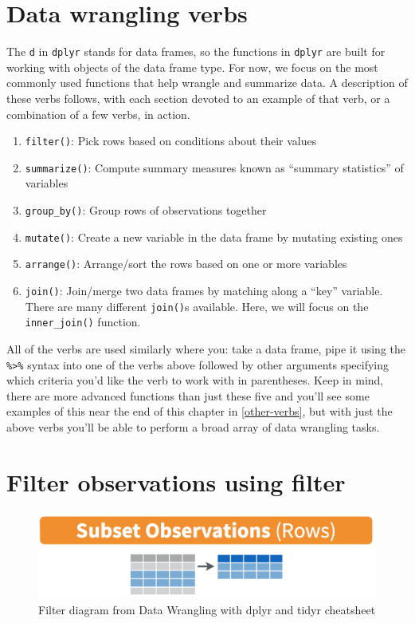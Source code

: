 \documentclass[12pt,]{krantz}
\providecommand{\tightlist}{%
  \setlength{\itemsep}{0pt}\setlength{\parskip}{0pt}}
\begin{document}
\section{Data wrangling verbs}\label{verbs}

The \texttt{d} in \texttt{dplyr} stands for data frames, so the
functions in \texttt{dplyr} are built for working with objects of the
data frame type. For now, we focus on the most commonly used functions
that help wrangle and summarize data. A description of these verbs
follows, with each section devoted to an example of that verb, or a
combination of a few verbs, in action.

\begin{enumerate}
\def\labelenumi{\arabic{enumi}.}
\tightlist
\item
  \texttt{filter()}: Pick rows based on conditions about their values
\item
  \texttt{summarize()}: Compute summary measures known as ``summary
  statistics'' of variables
\item
  \texttt{group\_by()}: Group rows of observations together
\item
  \texttt{mutate()}: Create a new variable in the data frame by mutating
  existing ones
\item
  \texttt{arrange()}: Arrange/sort the rows based on one or more
  variables
\item
  \texttt{join()}: Join/merge two data frames by matching along a
  ``key'' variable. There are many different \texttt{join()}s available.
  Here, we will focus on the \texttt{inner\_join()} function.
\end{enumerate}

All of the verbs are used similarly where you: take a data frame, pipe
it using the \texttt{\%\textgreater{}\%} syntax into one of the verbs
above followed by other arguments specifying which criteria you'd like
the verb to work with in parentheses. Keep in mind, there are more
advanced functions than just these five and you'll see some examples of
this near the end of this chapter in \ref{other-verbs}, but with just
the above verbs you'll be able to perform a broad array of data
wrangling tasks.

\section{Filter observations using filter}\label{filter}

\begin{figure}

{\centering \includegraphics[width=\textwidth]{images/filter} 

}

\caption{Filter diagram from Data Wrangling with dplyr and tidyr cheatsheet}\label{fig:filter}
\end{figure}
\end{document}
